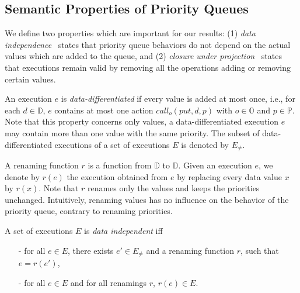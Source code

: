 \subsection{Semantic Properties of Priority Queues}\label{ssec:semantic_prop}

We define two properties which are %
important for our results: (1) \emph{data independence}~\cite{conf/popl/Wolper86,conf/tacas/AbdullaHHJR13} states that priority queue behaviors do not depend on the actual values which are added to the queue, and (2) \emph{closure under projection}~\cite{DBLP:conf/icalp/BouajjaniEEH15} states that executions remain valid by removing all the operations adding or removing certain values.

An execution $e$ is \emph{data-differentiated} if every value is added at most once, i.e., for each $d \in \mathbb{D}$, $e$ contains at most one action $\textit{call}_o(\textit{put},d,p)$ with $o\in\mathbb{O}$ and $p\in \mathbb{P}$. Note that this property concerns only values, a data-differentiated execution $e$ may contain more than one value with the same priority. The subset of data-differentiated executions of a set of executions $E$ is denoted by $E_{\neq}$.

A renaming function $r$ is a function from $\mathbb{D}$ to $\mathbb{D}$. Given an execution $e$, we denote by $r(e)$ the execution obtained from $e$ by replacing every data value $x$ by $r(x)$. Note that $r$ renames only the values and keeps the priorities unchanged. Intuitively, renaming values has no influence on the behavior of the priority queue, contrary to renaming priorities.

\begin{definition}\label{def:priority-value data-independence}
A set of executions $E$ is \emph{data independent} iff
\begin{itemize}
\setlength{\itemsep}{0.5pt}
\item[-] for all $e \in E$, there exists $e' \in E_{\neq}$ and a renaming function $r$, such that $e=r(e')$,

\item[-] for all $e \in E$ and for all renamings $r$, $r(e) \in E$.
\end{itemize}
\end{definition}

